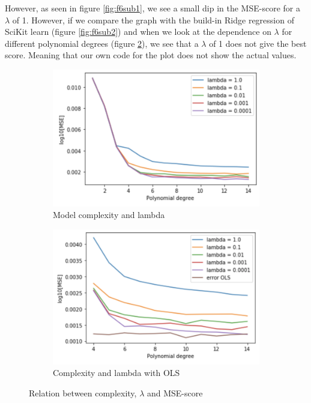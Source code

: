 \documentclass[12pt]{extarticle}
\begin{document}
However, as seen in figure \ref{fig:f6sub1}, we see a small dip in the MSE-score for a $\lambda$ of 1. However, if we compare the graph with the build-in Ridge regression of SciKit learn (figure \ref{fig:f6sub2}) and when we look at the dependence on $\lambda$ for different polynomial degrees (figure \ref{fig:f7sub2}), we see that a $\lambda$ of 1 does not give the best score. Meaning that our own code for the plot does not show the actual values.

\begin{figure}
    \centering
    \begin{subfigure}{.5\textwidth}
        \centering
        \includegraphics[width=.9\linewidth]{7}
        \caption{Model complexity and lambda}
        \label{fig:f7sub1}
    \end{subfigure}%
    \begin{subfigure}{.5\textwidth}
        \centering
        \includegraphics[width=.9\linewidth]{8}
        \caption{Complexity and lambda with OLS}
        \label{fig:f7sub2}
    \end{subfigure}
    \caption{Relation between complexity, $\lambda$ and MSE-score}
    \label{fig:f7}
\end{figure}
\end{document}
